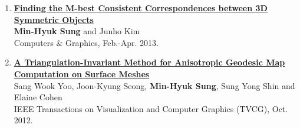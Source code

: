 \documentclass[letterpaper,10pt]{article} %
\newcommand{\blankline}{\quad\pagebreak[2]}
\begin{document}
{\begin{enumerate}
\item \label{cg13}
\href{http://dx.doi.org/10.1016/j.cag.2012.11.002}{\textbf{Finding the M-best Consistent Correspondences between 3D Symmetric Objects}} \\
\textbf{Min-Hyuk Sung} and Junho Kim\\
Computers \& Graphics, Feb.-Apr. 2013.\\
\blankline

\item \label{tvcg12}
\href{http://dx.doi.org/10.1109/TVCG.2012.29}{\textbf{A Triangulation-Invariant Method for Anisotropic Geodesic Map Computation on Surface Meshes}} \\
Sang Wook Yoo, Joon-Kyung Seong, \textbf{Min-Hyuk Sung}, Sung Yong Shin and Elaine Cohen\\
IEEE Transactions on Visualization and Computer Graphics (TVCG), Oct. 2012.\\
\blankline


\end{enumerate}}
\end{document}
